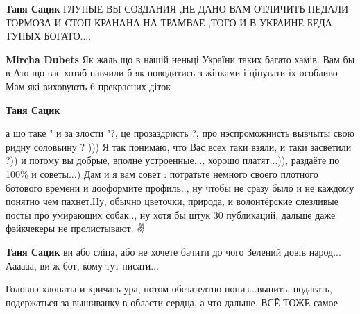 \begin{itemize}
\begin{itemize}
\textbf{Таня Сацик} ГЛУПЫЕ ВЫ СОЗДАНИЯ ,НЕ ДАНО ВАМ ОТЛИЧИТЬ ПЕДАЛИ ТОРМОЗА И СТОП КРАНАНА НА ТРАМВАЕ ,ТОГО И В УКРАИНЕ БЕДА ТУПЫХ БОГАТО....

 
\textbf{Mircha Dubets} Як жаль що в нашій неньці України таких багато хамів. Вам бы в Ато що вас хотяб навчили б як поводитись з жінками і цінувати їх особливо Мам які виховують 6 прекрасних діток

 
\textbf{Таня Сацик} 

а шо таке " и за злости "?, це прозаздристь ?, про нэспроможнисть вывчыты свою
ридну соловьину ? ))) Я так понимаю, что Вас всех таки взяли, и таки засветили
?)) и потому вы добрые, вполне устроенные..., хорошо платят...)), раздаёте по
100\% и советы...) Дам и я вам совет : потратьте немного своего плотного
ботового времени и дооформите профиль.., ну чтобы не сразу было и не каждому
понятно чем пахнет.Ну, обычно цветочки, природа, и волонтёрские слезливые посты
про умирающих собак.., ну хотя бы штук 30 публикаций, дальше даже фэйкчекеры не
пролистывают. \Smiley[1.0][yellow]✌

 
\textbf{Таня Сацик} ви або сліпа, або не хочете бачити до чого Зелений довів народ... Аааааа, ви ж бот, кому тут писати...
\end{itemize}

 

Головнэ хлопаты и кричать ура, потом обезателтно попиз...выпить, подавать,
подержаться за вышиванку в области сердца, а что дальше, ВСЁ ТОЖЕ самое



\end{itemize}
